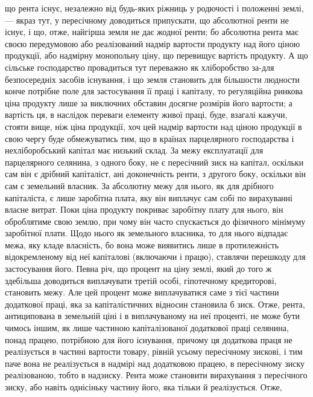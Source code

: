 \parcont{}  %
що рента існує, незалежно від будь-яких ріжниць у родючості і положенні
землі, — якраз тут, у пересічному доводиться припускати, що абсолютної ренти
не існує, і що, отже, найгірша земля не дає жодної ренти; бо абсолютна рента
має своєю передумовою або реалізований надмір вартости продукту над його ціною
продукції, або надмірну монопольну ціну, що перевищує вартість продукту. А що
сільське господарство провадиться тут переважно як хліборобство за-для безпосередніх
засобів існування, і що земля становить для більшости людности
конче потрібне поле для застосування її праці і капіталу, то регуляційна ринкова
ціна продукту лише за виключних обставин досягне розмірів його вартости;
а вартість ця, в наслідок переваги елементу живої праці, буде, взагалі кажучи,
стояти вище, ніж ціна продукції, хоч цей надмір вартости над ціною продукції
в свою чергу буде обмежуватись тим, що в країнах парцелярного господарства
і нехліборобський капітал має низький склад. За межу експлуатації для парцелярного
селянина, з одного боку, не є пересічний зиск на капітал, оскільки
сам він є дрібний капіталіст, ані доконечність ренти, з другого боку, оскільки
він сам є земельний власник. За абсолютну межу для нього, як для дрібного
капіталіста, є лише заробітна плата, яку він виплачує сам собі по вирахуванні
власне витрат. Поки ціна продукту покриває заробітну плату для нього, він
оброблятиме свою землю, при чому він часто спускається до фізичного мінімуму
заробітної плати. Щодо нього як земельного власника, то для нього відпадає
межа, яку кладе власність, бо вона може виявитись лише в протилежність
відокремленому від неї капіталові (включаючи і працю), ставлячи перешкоду для
застосування його. Певна річ, що процент на ціну землі, який до того ж здебільша
доводиться виплачувати третій особі, гіпотечному кредиторові, становить
межу. Але цей процент може виплачуватися саме з тієї частини додаткової
праці, яка за капіталістичних відносин становила б зиск. Отже, рента, антиципована
в земельній ціні і в виплачуваному на неї проценті, не може бути чимось
іншим, як лише частиною капіталізованої додаткової праці селянина, понад
працею, потрібною для його існування, причому ця додаткова праця не реалізується
в частині вартости товару, рівній усьому пересічному зискові, і тим
паче вона не реалізується в надмірі над додатковою працею, в пересічному зиску
реалізованою, тобто в надзиску. Рента може становити вирахування з пересічного
зиску, або навіть однісіньку частину його, яка тільки й реалізується. Отже,

